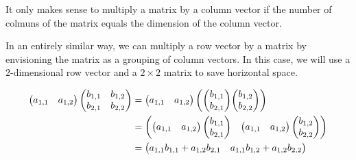 \documentclass{ximera}
\begin{document}
\begin{warning}
  It only makes sense to multiply a matrix by a column vector if the
  number of colmuns of the matrix equals the dimension of the column
  vector.
\end{warning}


In an entirely similar way, we can multiply a row vector by a matrix
by envisioning the matrix as a grouping of column vectors. In this
case, we will use a $2$-dimensional row vector and a $2\times2$ matrix
to save horizontal space.

\begin{align*}
\begin{pmatrix} a_{1,1} & a_{1,2}  \end{pmatrix}
\begin{pmatrix}
  b_{1,1} & b_{1,2} \\
  b_{2,1} & b_{2,2} 
\end{pmatrix}
&=
\begin{pmatrix} a_{1,1} & a_{1,2}  \end{pmatrix}\arraycolsep=0pt
\begin{pmatrix}
  \begin{pmatrix} b_{1,1} \\ b_{2,1} \\  \end{pmatrix} &
  \begin{pmatrix} b_{1,2} \\ b_{2,2} \\ \end{pmatrix} 
\end{pmatrix} \\
&=
\begin{pmatrix}
  \begin{pmatrix} a_{1,1} & a_{1,2} \end{pmatrix}\begin{pmatrix} b_{1,1} \\ b_{2,1} \end{pmatrix} &
  \begin{pmatrix} a_{1,1} & a_{1,2} \end{pmatrix}\begin{pmatrix} b_{1,2} \\ b_{2,2} \end{pmatrix} 
\end{pmatrix}\\
&=
\begin{pmatrix}
a_{1,1}b_{1,1}+a_{1,2}b_{2,1} &
a_{1,1}b_{1,2}+a_{1,2}b_{2,2}
\end{pmatrix}
\end{align*}
\end{document}

